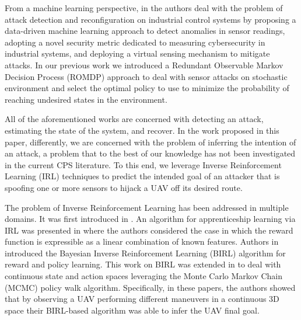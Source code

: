 \documentclass[letterpaper, 10 pt, conference]{ieeeconf}  %
\newcommand\NB[1]{$\spadesuit$\footnote{NB: #1}}
\begin{document}
From a machine learning perspective, in \cite{paridari2017framework} the authors deal with the problem of attack detection and reconfiguration on industrial control systems by proposing a data-driven machine learning approach to detect anomalies in sensor readings,  adopting a novel security metric dedicated to measuring cybersecurity in industrial systems, and deploying a virtual sensing mechanism to mitigate attacks. 
In our previous work \cite{bezzo2016stochastic} we introduced a Redundant Observable Markov Decision Process (ROMDP) approach to deal with sensor attacks on stochastic environment and select the optimal policy to use to minimize the probability of reaching undesired states in the environment. 

All of the aforementioned works are concerned with detecting an attack, estimating the state of the system, and recover. In the work proposed in this paper, differently, we are concerned with the problem of inferring the intention of an attack, a problem that to the best of our knowledge has not been investigated in the current CPS literature.
To this end, we leverage Inverse Reinforcement Learning (IRL) techniques to predict the intended goal of an attacker that is spoofing one or more sensors to hijack a UAV off its desired route.
%

The problem of Inverse Reinforcement Learning has been addressed in multiple domains. It was first introduced in \cite{ng2000algorithms}. An algorithm for apprenticeship learning via IRL was presented in \cite{abbeel2004apprenticeship} where the authors considered the case in which the reward function is expressible as a linear combination of known features. 
Authors in \cite{ramachandran2007bayesian} introduced the Bayesian Inverse Reinforcement Learning (BIRL) algorithm for reward and policy learning. This work on BIRL was extended in \cite{michini2015bayesian,michini2013scalable,michini2012improving} to deal with continuous state and action spaces leveraging the Monte Carlo Markov Chain (MCMC) policy walk algorithm. Specifically, in these papers, the authors showed that by observing a UAV performing different maneuvers in a continuous 3D space their BIRL-based algorithm was able to infer the UAV final goal. 
\end{document}

